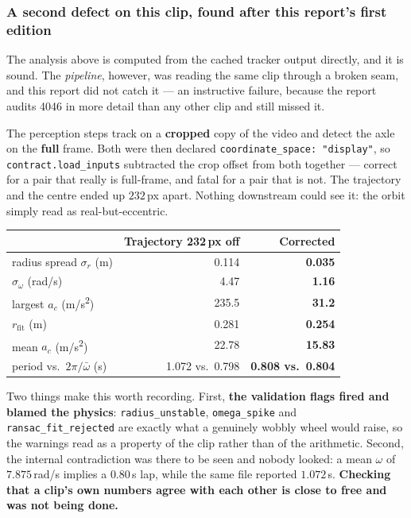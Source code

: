 \documentclass[11pt,a4paper]{article}
\begin{document}
\subsubsection{A second defect on this clip, found after this report's first edition}
\label{sec:coordbug}

The analysis above is computed from the cached tracker output directly, and it is sound. The
\emph{pipeline}, however, was reading the same clip through a broken seam, and this report did not
catch it --- an instructive failure, because the report audits 4046 in more detail than any other
clip and still missed it.

The perception steps track on a \textbf{cropped} copy of the video and detect the axle on the
\textbf{full} frame. Both were then declared \texttt{coordinate\_space: "display"}, so
\texttt{contract.load\_inputs} subtracted the crop offset from both together --- correct for a pair
that really is full-frame, and fatal for a pair that is not. The trajectory and the centre ended
up $232$\,px apart. Nothing downstream could see it: the orbit simply read as real-but-eccentric.

\begin{center}
\footnotesize
\begin{tabular}{lrr}
\toprule
& Trajectory 232\,px off & Corrected \\
\midrule
radius spread $\sigma_r$ (m)     & 0.114 & \textbf{0.035} \\
$\sigma_\omega$ (rad/s)          & 4.47  & \textbf{1.16} \\
largest $a_c$ (m/s\textsuperscript{2}) & 235.5 & \textbf{31.2} \\
$r_{\mathrm{fit}}$ (m)           & 0.281 & \textbf{0.254} \\
mean $a_c$ (m/s\textsuperscript{2})    & 22.78 & \textbf{15.83} \\
period vs.\ $2\pi/\bar\omega$ (s) & 1.072 vs.\ 0.798 & \textbf{0.808 vs.\ 0.804} \\
\bottomrule
\end{tabular}
\end{center}

Two things make this worth recording. First, \textbf{the validation flags fired and blamed the
physics}: \texttt{radius\_unstable}, \texttt{omega\_spike} and \texttt{ransac\_fit\_rejected} are
exactly what a genuinely wobbly wheel would raise, so the warnings read as a property of the clip
rather than of the arithmetic. Second, the internal contradiction was there to be seen and nobody
looked: a mean $\omega$ of $7.875$\,rad/s implies a $0.80$\,s lap, while the same file reported
$1.072$\,s. \textbf{Checking that a clip's own numbers agree with each other is close to free and
was not being done.}
\end{document}
